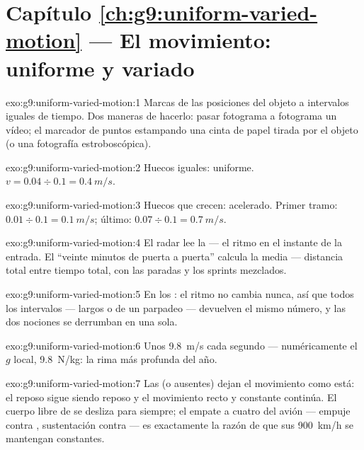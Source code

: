 \section*{Capítulo \ref{ch:g9:uniform-varied-motion} --- El movimiento: uniforme y variado}

\begin{solution}{exo:g9:uniform-varied-motion:1}
Marcas de las posiciones del objeto a intervalos iguales de tiempo. Dos
maneras de hacerlo: pasar fotograma a fotograma un vídeo; el marcador
de puntos estampando una cinta de papel tirada por el objeto (o una
fotografía estroboscópica).
\end{solution}

\begin{solution}{exo:g9:uniform-varied-motion:2}
Huecos iguales: uniforme. $v = 0.04 \div 0.1 = \qty{0.4}{m/s}$.
\end{solution}

\begin{solution}{exo:g9:uniform-varied-motion:3}
Huecos que crecen: acelerado. Primer tramo: $0.01 \div 0.1 =
\qty{0.1}{m/s}$; último: $0.07 \div 0.1 = \qty{0.7}{m/s}$.
\end{solution}

\begin{solution}{exo:g9:uniform-varied-motion:4}
El radar lee la  --- el ritmo en el instante
de la entrada. El ``veinte minutos de puerta a puerta'' calcula la
media --- distancia total entre tiempo total, con las paradas y los
sprints mezclados.
\end{solution}

\begin{solution}{exo:g9:uniform-varied-motion:5}
En los : el ritmo no cambia nunca, así que
todos los intervalos --- largos o de un parpadeo --- devuelven el mismo
número, y las dos nociones se derrumban en una sola.
\end{solution}

\begin{solution}{exo:g9:uniform-varied-motion:6}
Unos \qty{9.8}{m/s} cada segundo --- numéricamente el $g$ local,
\qty{9.8}{N/kg}: la rima más profunda del año.
\end{solution}

\begin{solution}{exo:g9:uniform-varied-motion:7}
Las   (o ausentes) dejan el movimiento como
está: el reposo sigue siendo reposo y el movimiento recto y constante
continúa. El cuerpo libre de  se desliza para siempre; el empate
a cuatro del avión --- empuje contra , sustentación contra
 --- es exactamente la razón de que sus \qty{900}{km/h} se
mantengan constantes.
\end{solution}

